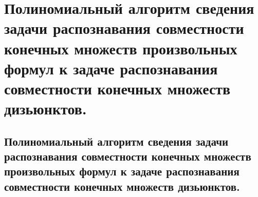 \section{Полиномиальный алгоритм сведения задачи распознавания совместности конечных множеств произвольных формул к задаче распознавания совместности конечных множеств дизьюнктов.}

\subsection{Полиномиальный алгоритм сведения задачи распознавания совместности конечных множеств произвольных формул к задаче распознавания совместности конечных множеств дизьюнктов.}


